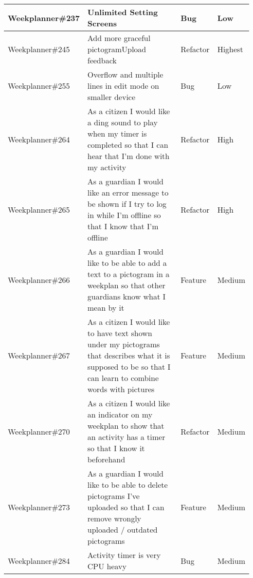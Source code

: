 \begin{longtable}{|p{2.9cm}|p{7cm}|p{1.4cm}|p{1.5cm}|}
    Weekplanner\#237 & Unlimited Setting Screens                                                                                                                                                 & Bug      & Low  \\ \hline
    Weekplanner\#245 & Add more graceful pictogramUpload feedback                                                                                                                               & Refactor      & Highest  \\ \hline
    Weekplanner\#255 & Overflow and multiple lines in edit mode on smaller device                                                                                                                & Bug      & Low  \\ \hline
    Weekplanner\#264 & As a citizen I would like a ding sound to play when my timer is completed so that I can hear that I'm done with my activity                                               & Refactor      & High  \\ \hline
    Weekplanner\#265 & As a guardian I would like an error message to be shown if I try to log in while I'm offline so that I know that I'm offline                                              & Refactor      & High  \\ \hline
    Weekplanner\#266 & As a guardian I would like to be able to add a text to a pictogram in a weekplan so that other guardians know what I mean by it                                           & Feature      & Medium  \\ \hline
    Weekplanner\#267 & As a citizen I would like to have text shown under my pictograms that describes what it is supposed to be so that I can learn to combine words with pictures              & Feature      & Medium  \\ \hline
    Weekplanner\#270 & As a citizen I would like an indicator on my weekplan to show that an activity has a timer so that I know it beforehand                                                   & Refactor      & Medium  \\ \hline
    Weekplanner\#273 & As a guardian I would like to be able to delete pictograms I've uploaded so that I can remove wrongly uploaded / outdated pictograms                                      & Feature     & Medium  \\ \hline
    Weekplanner\#284 & Activity timer is very CPU heavy                                                                                                                                          & Bug      & Medium  \\ \hline

\end{longtable}
